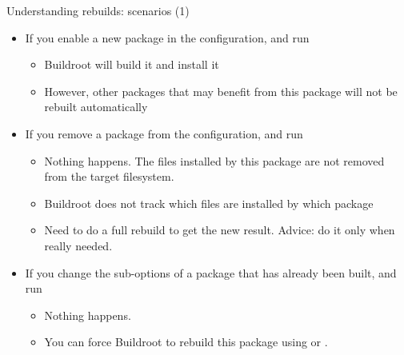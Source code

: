 \begin{frame}{Understanding rebuilds: scenarios (1)}
  \begin{itemize}
  \item If you enable a new package in the configuration, and run
    \begin{itemize}
    \item Buildroot will build it and install it
    \item However, other packages that may benefit from this package
      will not be rebuilt automatically
    \end{itemize}
  \item If you remove a package from the configuration, and run
    \begin{itemize}
    \item Nothing happens. The files installed by this package are not
      removed from the target filesystem.
    \item Buildroot does not track which files are installed by which
      package
    \item Need to do a full rebuild to get the new result. Advice: do
      it only when really needed.
    \end{itemize}
  \item If you change the sub-options of a package that has already
    been built, and run 
    \begin{itemize}
    \item Nothing happens.
    \item You can force Buildroot to rebuild this package using
       or .
    \end{itemize}
  \end{itemize}
\end{frame}

